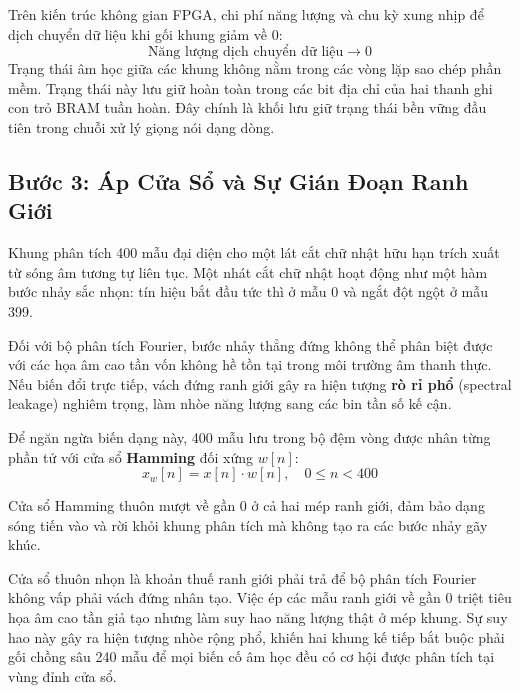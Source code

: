 \documentclass[11pt,a4paper]{article}
\begin{document}
\begin{groundbreaking}
Trên kiến trúc không gian FPGA, chi phí năng lượng và chu kỳ xung nhịp để dịch chuyển dữ liệu khi gối khung giảm về 0:
$$\text{Năng lượng dịch chuyển dữ liệu} \to 0$$
Trạng thái âm học giữa các khung không nằm trong các vòng lặp sao chép phần mềm. Trạng thái này lưu giữ hoàn toàn trong các bit địa chỉ của hai thanh ghi con trỏ BRAM tuần hoàn. Đây chính là khối lưu giữ trạng thái bền vững đầu tiên trong chuỗi xử lý giọng nói dạng dòng.
\end{groundbreaking}

\clearpage


\subsection*{Bước 3: Áp Cửa Sổ và Sự Gián Đoạn Ranh Giới}

Khung phân tích 400 mẫu đại diện cho một lát cắt chữ nhật hữu hạn trích xuất từ sóng âm tương tự liên tục. Một nhát cắt chữ nhật hoạt động như một hàm bước nhảy sắc nhọn: tín hiệu bắt đầu tức thì ở mẫu 0 và ngắt đột ngột ở mẫu 399.

Đối với bộ phân tích Fourier, bước nhảy thẳng đứng không thể phân biệt được với các họa âm cao tần vốn không hề tồn tại trong môi trường âm thanh thực. Nếu biến đổi trực tiếp, vách đứng ranh giới gây ra hiện tượng \textbf{rò rỉ phổ} (spectral leakage) nghiêm trọng, làm nhòe năng lượng sang các bin tần số kế cận.

Để ngăn ngừa biến dạng này, 400 mẫu lưu trong bộ đệm vòng được nhân từng phần tử với cửa sổ \textbf{Hamming} đối xứng $w[n]$:
$$x_w[n] = x[n] \cdot w[n], \quad 0 \le n < 400$$

Cửa sổ Hamming thuôn mượt về gần 0 ở cả hai mép ranh giới, đảm bảo dạng sóng tiến vào và rời khỏi khung phân tích mà không tạo ra các bước nhảy gãy khúc.

\begin{physicalinsight}
Cửa sổ thuôn nhọn là khoản thuế ranh giới phải trả để bộ phân tích Fourier không vấp phải vách đứng nhân tạo. Việc ép các mẫu ranh giới về gần 0 triệt tiêu họa âm cao tần giả tạo nhưng làm suy hao năng lượng thật ở mép khung. Sự suy hao này gây ra hiện tượng nhòe rộng phổ, khiến hai khung kế tiếp bắt buộc phải gối chồng sâu 240 mẫu để mọi biến cố âm học đều có cơ hội được phân tích tại vùng đỉnh cửa sổ.
\end{physicalinsight}
\end{document}

